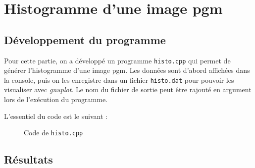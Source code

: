 \documentclass[french,a4paper,10pt]{article}
\begin{document}
	\newpage
	\section{Histogramme d'une image pgm}\label{sec:3}

	\subsection{D\'eveloppement du programme}\label{subsec:3.1}

	Pour cette partie, on a d\'evelopp\'e un programme \texttt{histo.cpp} qui permet de g\'en\'erer l'histogramme
	d'une image pgm.
	Les données sont d'abord affichées dans la console, puis on les enregistre dans un fichier \texttt{histo.dat} pour
	pouvoir les visualiser avec \emph{gnuplot}.
	Le nom du fichier de sortie peut être rajouté en argument lors de l'exécution du programme.

	L'essentiel du code est le suivant : %
	\begin{figure}[!htb]
		\centering
		\caption{Code de \texttt{histo.cpp}}\label{Fig:histo-code}
	\end{figure}

	\subsection{R\'esultats}\label{subsec:3.2}
\end{document}
